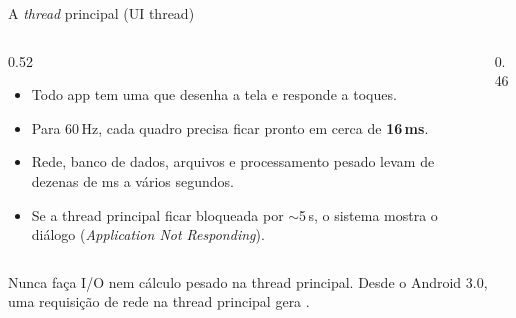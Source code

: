 \documentclass[aspectratio=169,10pt]{beamer}
\begin{document}
\begin{frame}{A \emph{thread} principal (UI thread)}
  \begin{columns}[c]
    \begin{column}{0.52\textwidth}
      \small
      \begin{itemize}
        \item Todo app tem uma  que desenha a tela e responde a toques.
        \item Para 60\,Hz, cada quadro precisa ficar pronto em cerca de \textbf{16\,ms}.
        \item Rede, banco de dados, arquivos e processamento pesado levam de dezenas de ms a vários segundos.
        \item Se a thread principal ficar bloqueada por $\sim$5\,s, o sistema mostra o diálogo  (\emph{Application Not Responding}).
      \end{itemize}
    \end{column}
    \begin{column}{0.46\textwidth}
      \centering
    \end{column}
  \end{columns}
  \begin{atencao}
    Nunca faça I/O nem cálculo pesado na thread principal. Desde o Android 3.0, uma requisição de rede na thread principal gera .
  \end{atencao}
\end{frame}
\end{document}
